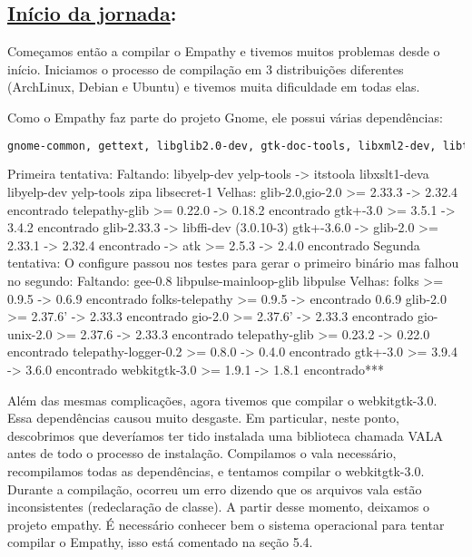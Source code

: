 \subsection*{\underline{Início da jornada}:}
Começamos então a compilar o Empathy e tivemos muitos problemas desde o início.
Iniciamos o processo de compilação em 3 distribuições diferentes (ArchLinux,
Debian e Ubuntu) e tivemos muita dificuldade em todas elas.

Como o Empathy faz parte do projeto Gnome, ele possui várias dependências:

\begin{lstlisting}[language=bash]
	gnome-common, gettext, libglib2.0-dev, gtk-doc-tools, libxml2-dev, libtelepathy-glib-dev, libmissioncontrol-client-dev, libtelepathy-farsight-dev, libx11-dev, libgtk2.0-dev, libice-dev{a}, libcanberra-gtk-dev, libgstreamer-plugins-base0.10-dev, libebook1.2-dev, libnotify-dev, libunique-dev, libgnome-keyring-dev, libtelepathy-logger-dev, libwebkitgtk-3.0-dev, libgnutls-dev, libfolks-telepathy-dev, libcanberra-gtk3-dev, libgcr-3-dev, gsettings-desktop-schemas-dev
\end{lstlisting}

Primeira tentativa:
Faltando:
  libyelp-dev yelp-tools -> itstool{a} libxslt1-dev{a} libyelp-dev yelp-tools zip{a}
  libsecret-1
    Velhas:
  {glib-2.0,gio-2.0} >= 2.33.3  -> 2.32.4 encontrado
  telepathy-glib >= 0.22.0 -> 0.18.2 encontrado
       gtk+-3.0 >= 3.5.1 -> 3.4.2 encontrado
glib-2.33.3 -> libffi-dev (3.0.10-3)
gtk+-3.6.0 -> glib-2.0 >= 2.33.1 -> 2.32.4 encontrado
       -> atk >= 2.5.3 -> 2.4.0 encontrado
Segunda tentativa:
O configure passou nos testes para   gerar o primeiro binário mas falhou no segundo:
    Faltando:
gee-0.8
libpulse-mainloop-glib
libpulse
Velhas:
folks >= 0.9.5 -> 0.6.9 encontrado
folks-telepathy >= 0.9.5 -> encontrado 0.6.9
glib-2.0 >= 2.37.6' -> 2.33.3 encontrado
gio-2.0 >= 2.37.6' -> 2.33.3 encontrado
gio-unix-2.0 >= 2.37.6 -> 2.33.3 encontrado
telepathy-glib >= 0.23.2 -> 0.22.0 encontrado
telepathy-logger-0.2 >= 0.8.0 -> 0.4.0 encontrado
gtk+-3.0 >= 3.9.4 -> 3.6.0 encontrado
webkitgtk-3.0 >= 1.9.1 -> 1.8.1 encontrado***

Além das mesmas complicações, agora tivemos que compilar o webkitgtk-3.0.
Essa dependências causou muito desgaste. Em particular, neste ponto, descobrimos que deveríamos ter tido instalada uma biblioteca chamada VALA antes de todo o processo de instalação.
Compilamos o vala necessário, recompilamos todas as dependências, e tentamos compilar o webkitgtk-3.0. Durante a compilação, ocorreu um erro dizendo que os arquivos vala estão inconsistentes (redeclaração de classe). A partir desse momento, deixamos o projeto empathy.
É necessário conhecer bem o sistema operacional para tentar compilar o Empathy, isso está comentado na seção 5.4.


